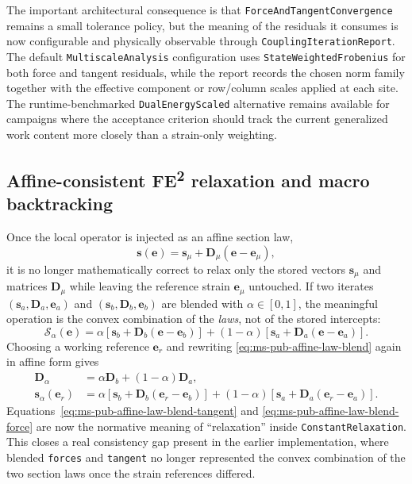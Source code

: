 The important architectural consequence is that
\texttt{ForceAndTangentConvergence} remains a small tolerance policy, but the
meaning of the residuals it consumes is now configurable and physically
observable through \texttt{CouplingIterationReport}.  The default
\texttt{MultiscaleAnalysis} configuration uses
\texttt{StateWeightedFrobenius} for both force and tangent residuals, while the
report records the chosen norm family together with the effective component or
row/column scales applied at each site.  The runtime-benchmarked
\texttt{DualEnergyScaled} alternative remains available for campaigns where the
acceptance criterion should track the current generalized work content more
closely than a strain-only weighting.

\subsection{Affine-consistent FE\textsuperscript{2} relaxation and macro backtracking}
\label{sec:ms-pub-affine-relaxation}

Once the local operator is injected as an affine section law,
\begin{equation}
  \mathbf{s}(\mathbf{e})
  = \mathbf{s}_{\mu}
    + \mathbf{D}_{\mu}\left(\mathbf{e}-\mathbf{e}_{\mu}\right),
  \label{eq:ms-pub-affine-section-law}
\end{equation}
it is no longer mathematically correct to relax only the stored vectors
\(\mathbf{s}_{\mu}\) and matrices \(\mathbf{D}_{\mu}\) while leaving the
reference strain \(\mathbf{e}_{\mu}\) untouched.  If two iterates
\((\mathbf{s}_a,\mathbf{D}_a,\mathbf{e}_a)\) and
\((\mathbf{s}_b,\mathbf{D}_b,\mathbf{e}_b)\) are blended with
\(\alpha\in[0,1]\), the meaningful operation is the convex combination of the
\emph{laws}, not of the stored intercepts:
\begin{equation}
  \mathcal{S}_{\alpha}(\mathbf{e})
  = \alpha\left[\mathbf{s}_b
      + \mathbf{D}_b\left(\mathbf{e}-\mathbf{e}_b\right)\right]
    + (1-\alpha)\left[\mathbf{s}_a
      + \mathbf{D}_a\left(\mathbf{e}-\mathbf{e}_a\right)\right].
  \label{eq:ms-pub-affine-law-blend}
\end{equation}
Choosing a working reference \(\mathbf{e}_r\) and rewriting
\eqref{eq:ms-pub-affine-law-blend} again in affine form gives
\begin{align}
  \mathbf{D}_{\alpha}
    &= \alpha \mathbf{D}_b + (1-\alpha)\mathbf{D}_a,
    \label{eq:ms-pub-affine-law-blend-tangent}\\
  \mathbf{s}_{\alpha}(\mathbf{e}_r)
    &= \alpha\left[\mathbf{s}_b
         + \mathbf{D}_b\left(\mathbf{e}_r-\mathbf{e}_b\right)\right]
     + (1-\alpha)\left[\mathbf{s}_a
         + \mathbf{D}_a\left(\mathbf{e}_r-\mathbf{e}_a\right)\right].
    \label{eq:ms-pub-affine-law-blend-force}
\end{align}
Equations~\eqref{eq:ms-pub-affine-law-blend-tangent} and
\eqref{eq:ms-pub-affine-law-blend-force} are now the normative meaning of
``relaxation'' inside \texttt{ConstantRelaxation}.  This closes a real
consistency gap present in the earlier implementation, where blended
\texttt{forces} and \texttt{tangent} no longer represented the convex
combination of the two section laws once the strain references differed.

